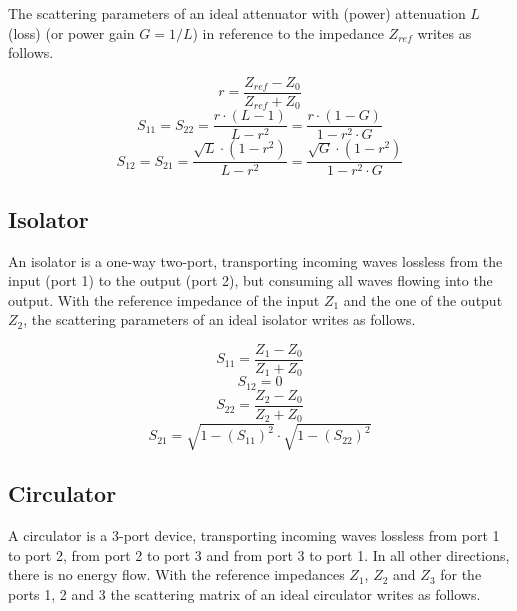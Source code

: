 \documentclass[10pt]{report}
\begin{document}
The scattering parameters of an ideal attenuator with (power) attenuation $L$
(loss) (or power gain $G=1/L$) in reference to the impedance $Z_{ref}$ writes as follows.

\begin{equation}
r = \frac{Z_{ref}-Z_0}{Z_{ref}+Z_0}
\end{equation}
\begin{equation}
S_{11} = S_{22} = \frac{r\cdot(L-1)}{L-r^2} = \frac{r\cdot(1-G)}{1-r^2\cdot G}
\end{equation}
\begin{equation}
S_{12} = S_{21} = \frac{\sqrt{L}\cdot(1-r^2)}{L-r^2} = \frac{\sqrt{G}\cdot(1-r^2)}{1-r^2\cdot G}
\end{equation}

\subsection{Isolator}

An isolator is a one-way two-port, transporting incoming waves
lossless from the input (port 1) to the output (port 2), but consuming
all waves flowing into the output. With the reference impedance of the
input $Z_1$ and the one of the output $Z_2$, the scattering parameters
of an ideal isolator writes as follows.

\begin{equation}
S_{11} = \frac{Z_1-Z_0}{Z_1+Z_0}
\end{equation}
\begin{equation}
S_{12} = 0
\end{equation}
\begin{equation}
S_{22} = \frac{Z_2-Z_0}{Z_2+Z_0}
\end{equation}
\begin{equation}
S_{21} = \sqrt{1-(S_{11})^2}\cdot\sqrt{1-(S_{22})^2}
\end{equation}

\subsection{Circulator}
\label{sec:CirculatorSparameter}

A circulator is a 3-port device, transporting incoming waves lossless
from port 1 to port 2, from port 2 to port 3 and from port 3 to port
1.  In all other directions, there is no energy flow.  With the
reference impedances $Z_1$, $Z_2$ and $Z_3$ for the ports 1, 2 and 3
the scattering matrix of an ideal circulator writes as follows.
\end{document}
